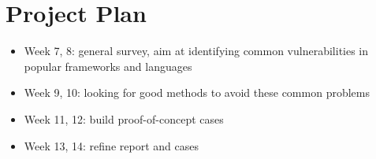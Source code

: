\documentclass[12pt, a4paper]{article}
\begin{document}
\section{Project Plan}
\begin{itemize}
    \item Week 7, 8: general survey, aim at identifying common vulnerabilities in popular
        frameworks and languages
    \item Week 9, 10: looking for good methods to avoid these common problems
    \item Week 11, 12: build proof-of-concept cases
    \item Week 13, 14: refine report and cases
\end{itemize}



\end{document}
